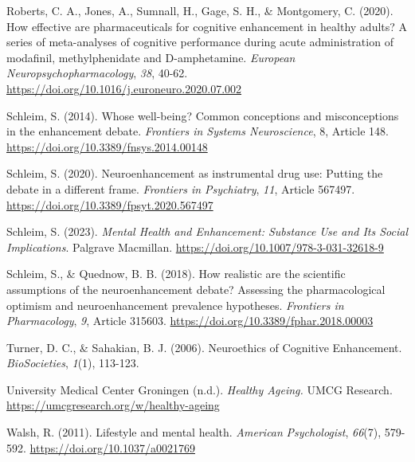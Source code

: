 \documentclass[authordate, reflection,issue]{jote-new-article}
\begin{document}
Roberts, C. A., Jones, A., Sumnall, H., Gage, S. H., \& Montgomery, C. (2020). How effective are pharmaceuticals for cognitive enhancement in healthy adults? A series of meta-analyses of cognitive performance during acute administration of modafinil, methylphenidate and D-amphetamine. \emph{European Neuropsychopharmacology}, \emph{38}, 40-62. \url{https://doi.org/10.1016/j.euroneuro.2020.07.002}







Schleim, S. (2014). Whose well-being? Common conceptions and misconceptions in the enhancement debate. \emph{Frontiers in Systems Neuroscience}, 8, Article 148. \url{https://doi.org/10.3389/fnsys.2014.00148}







Schleim, S. (2020). Neuroenhancement as instrumental drug use: Putting the debate in a different frame. \emph{Frontiers in Psychiatry}, \emph{11}, Article 567497. \url{https://doi.org/10.3389/fpsyt.2020.567497}







Schleim, S. (2023). \emph{Mental Health and Enhancement: Substance Use and Its Social Implications}. Palgrave Macmillan. \url{https://doi.org/10.1007/978-3-031-32618-9}







Schleim, S., \& Quednow, B. B. (2018). How realistic are the scientific assumptions of the neuroenhancement debate? Assessing the pharmacological optimism and neuroenhancement prevalence hypotheses. \emph{Frontiers in Pharmacology}, \emph{9}, Article 315603. \url{https://doi.org/10.3389/fphar.2018.00003}







Turner, D. C., \& Sahakian, B. J. (2006). Neuroethics of Cognitive Enhancement. \emph{BioSocieties}, \emph{1}(1), 113-123.







University Medical Center Groningen (n.d.). \emph{Healthy Ageing. }UMCG Research. \url{https://umcgresearch.org/w/healthy-ageing}







Walsh, R. (2011). Lifestyle and mental health. \emph{American }\emph{Psychologist}, \emph{66}(7), 579-592. \url{https://doi.org/10.1037/a0021769}
\end{document}
